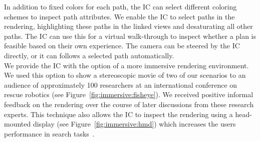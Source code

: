 \documentclass{egpubl}
\begin{document}
%
 In addition to fixed colors for each path, the IC can select different coloring schemes to inspect path attributes. We enable the IC to select paths in the rendering, highlighting these paths in the linked views and desaturating all other paths. The IC can use this for a virtual walk-through to inspect whether a plan is feasible based on their own experience. The camera can be steered by the IC directly, or it can follows a selected path automatically.\\
%
 We provide the IC with the option of a more immersive rendering environment. We used this option to show a stereoscopic movie of two of our scenarios to an audience of approximately 100 researchers at an international conference on rescue robotics (see Figure~\ref{fig:immersive:fisheye}). We received positive informal feedback on the rendering over the course of later discussions from these research experts. This technique also allows the IC to inspect the rendering using a head-mounted display (see Figure~\ref{fig:immersive:hmd}) which increases the users performance in search tasks~\cite{pausch1997quantifying}. 
\end{document}
